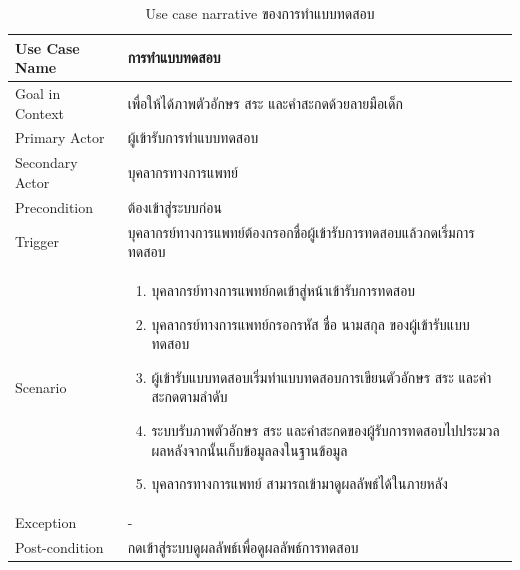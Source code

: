 \documentclass[12pt,oneside,openright,a4paper]{cpe-thai-project}
\begin{document}
\begin{itemize}
\begin{table}[!h]
      \caption{Use case narrative ของการทำแบบทดสอบ}\label{tbl:application1}
      \begin{tabular}{|p{4cm}|p{10cm}|} \hline
      Use Case Name & การทำแบบทดสอบ \\ \hline
      Goal in Context & เพื่อให้ได้ภาพตัวอักษร สระ และคำสะกดด้วยลายมือเด็ก \\ \hline
      Primary Actor & ผู้เข้ารับการทำแบบทดสอบ \\ \hline
      Secondary Actor & บุคลากรทางการแพทย์ \\ \hline
      Precondition & ต้องเข้าสู่ระบบก่อน \\ \hline
      Trigger & บุคลากรย์ทางการแพทย์ต้องกรอกชื่อผู้เข้ารับการทดสอบแล้วกดเริ่มการทดสอบ \\ \hline
      Scenario & \begin{enumerate}
        \item บุคลากรย์ทางการแพทย์กดเข้าสู่หน้าเข้ารับการทดสอบ
        \item บุคลากรย์ทางการแพทย์กรอกรหัส ชื่อ นามสกุล ของผู้เข้ารับแบบทดสอบ
        \item ผู้เข้ารับแบบทดสอบเริ่มทำแบบทดสอบการเขียนตัวอักษร สระ และคำสะกดตามลำดับ
        \item ระบบรับภาพตัวอักษร สระ และคำสะกดของผู้รับการทดสอบไปประมวลผลหลังจากนั้นเก็บข้อมูลลงในฐานข้อมูล
        \item บุคลากรทางการแพทย์ สามารถเข้ามาดูผลลัพธ์ได้ในภายหลัง
      \end{enumerate} \\ \hline
      Exception & - \\ \hline
      Post-condition & กดเข้าสู่ระบบดูผลลัพธ์เพื่อดูผลลัพธ์การทดสอบ\\ \hline
      

\end{tabular}
\end{table}
\end{itemize}
\end{document}
